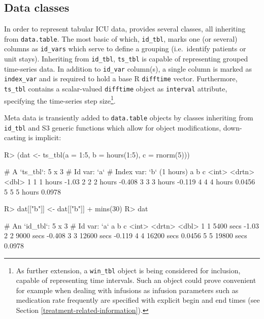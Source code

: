 \documentclass[
  notitle]{jss}
\begin{document}
\hypertarget{data-classes}{%
\subsection{Data classes}\label{data-classes}}

In order to represent tabular ICU data,  provides several
classes, all inheriting from \texttt{data.table}. The most basic of
which, \texttt{id\_tbl}, marks one (or several) columns as
\texttt{id\_vars} which serve to define a grouping (i.e.~identify
patients or unit stays). Inheriting from \texttt{id\_tbl},
\texttt{ts\_tbl} is capable of representing grouped time-series data. In
addition to \texttt{id\_var} column(s), a single column is marked as
\texttt{index\_var} and is required to hold a base R \texttt{difftime}
vector. Furthermore, \texttt{ts\_tbl} contains a scalar-valued
\texttt{difftime} object as \texttt{interval} attribute, specifying the
time-series step size\footnote{As further extension, a \texttt{win\_tbl}
  object is being considered for inclusion, capable of representing time
  intervals. Such an object could prove convenient for example when
  dealing with infusions as infusion parameters such as medication rate
  frequently are specified with explicit begin and end times (see
  Section \ref{treatment-related-information}).}.

Meta data is transiently added to \texttt{data.table} objects by classes
inheriting from \texttt{id\_tbl} and S3 generic functions which allow
for object modifications, down-casting is implicit:

\begin{CodeChunk}
\begin{CodeInput}
R> (dat <- ts_tbl(a = 1:5, b = hours(1:5), c = rnorm(5)))
\end{CodeInput}
\begin{CodeOutput}
# A `ts_tbl`: 5 x 3
# Id var:     `a`
# Index var:  `b` (1 hours)
      a b             c
  <int> <drtn>    <dbl>
1     1 1 hours -1.03
2     2 2 hours -0.408
3     3 3 hours -0.119
4     4 4 hours  0.0456
5     5 5 hours  0.0978
\end{CodeOutput}
\begin{CodeInput}
R> dat[["b"]] <- dat[["b"]] + mins(30)
R> dat
\end{CodeInput}
\begin{CodeOutput}
# An `id_tbl`: 5 x 3
# Id var:      `a`
      a b                c
  <int> <drtn>       <dbl>
1     1  5400 secs -1.03
2     2  9000 secs -0.408
3     3 12600 secs -0.119
4     4 16200 secs  0.0456
5     5 19800 secs  0.0978
\end{CodeOutput}
\end{CodeChunk}
\end{document}
